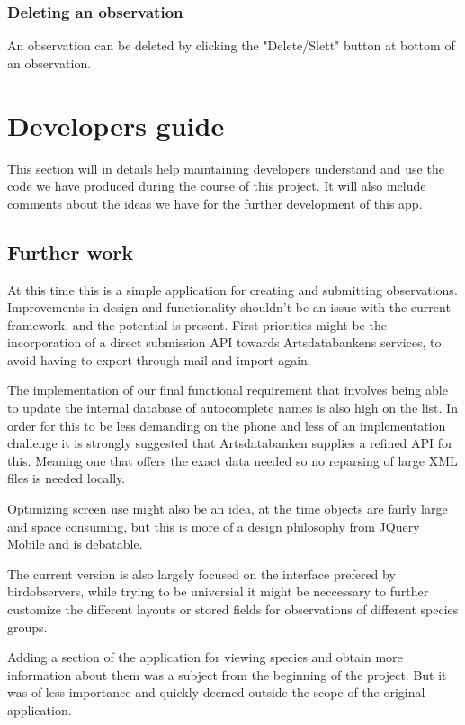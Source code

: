 \subsubsection{Deleting an observation}
An observation can be deleted by clicking the "Delete/Slett" button at bottom of an observation.

\section{Developers guide}

This section will in details help maintaining developers understand and use the
code we have produced during the course of this project. It will also include
comments about the ideas we have for the further development of this app.

\subsection{Further work}
At this time this is a simple application for creating and submitting
observations. Improvements in design and functionality shouldn't be an issue with the current framework,
and the potential is present. First priorities might be the incorporation of a
direct submission API towards Artsdatabankens services, to avoid having to
export through mail and import again. 

The implementation of our final functional requirement that involves being able to update
the internal database of autocomplete names is also high on the list. In order for this to be
less demanding on the phone and less of an implementation challenge it is strongly suggested 
that Artsdatabanken supplies a refined API for this.
Meaning one that offers the exact data needed so no reparsing of large XML files is needed locally.

Optimizing screen use might also be an
idea, at the time objects are fairly large and space consuming, but this is
more of a design philosophy from JQuery Mobile and is debatable.

The current version is also largely focused on the interface prefered by birdobservers, 
while trying to be universial it might be neccessary to further customize the different 
layouts or stored fields for observations of different species groups.

Adding a section of the application for viewing species and obtain more
information about them was a subject from the beginning of the project.  But it
was of less importance and quickly deemed outside the scope of the original
application.

